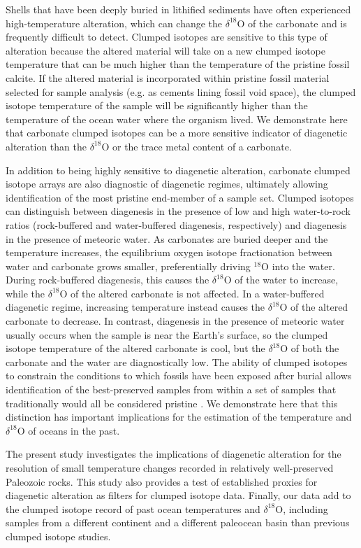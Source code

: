 \documentclass[5p, authoryear]{elsarticle}
\begin{document}
Shells that have been deeply buried in lithified sediments have often experienced high-temperature alteration, which can change the $\delta^{18}$O of the carbonate and is frequently difficult to detect. Clumped isotopes are sensitive to this type of alteration because the altered material will take on a new clumped isotope temperature that can be much higher than the temperature of the pristine fossil calcite. If the altered material is incorporated within pristine fossil material selected for sample analysis (e.g. as cements lining fossil void space), the clumped isotope temperature of the sample will be significantly higher than the temperature of the ocean water where the organism lived. We demonstrate here that carbonate clumped isotopes can be a more sensitive indicator of diagenetic alteration than the $\delta^{18}$O or the trace metal content of a carbonate. 

In addition to being highly sensitive to diagenetic alteration, carbonate clumped isotope arrays are also diagnostic of diagenetic regimes, ultimately allowing identification of the most pristine end-member of a sample set. Clumped isotopes can distinguish between diagenesis in the presence of low and high water-to-rock ratios (rock-buffered and water-buffered diagenesis, respectively) and diagenesis in the presence of meteoric water. As carbonates are buried deeper and the temperature increases, the equilibrium oxygen isotope fractionation between water and carbonate grows smaller, preferentially driving $^{18}$O into the water. During rock-buffered diagenesis, this causes the $\delta^{18}$O of the water to increase, while the $\delta^{18}$O of the altered carbonate is not affected. In a water-buffered diagenetic regime, increasing temperature instead causes the $\delta^{18}$O of the altered carbonate to decrease. In contrast, diagenesis in the presence of meteoric water usually occurs when the sample is near the Earth's surface, so the clumped isotope temperature of the altered carbonate is cool, but the $\delta^{18}$O of both the carbonate and the water are diagnostically low. The ability of clumped isotopes to constrain the conditions to which fossils have been exposed after burial allows identification of the best-preserved samples from within a set of samples that traditionally would all be considered pristine \citep{Eiler2011}. We demonstrate here that this distinction has important implications for the estimation of the temperature and $\delta^{18}$O of oceans in the past.  

The present study investigates the implications of diagenetic alteration for the resolution of small temperature changes recorded in relatively well-preserved Paleozoic rocks. This study also provides a test of established proxies for diagenetic alteration as filters for clumped isotope data. Finally, our data add to the clumped isotope record of past ocean temperatures and $\delta^{18}$O, including samples from a different continent and a different paleocean basin than previous clumped isotope studies. 
\end{document}
